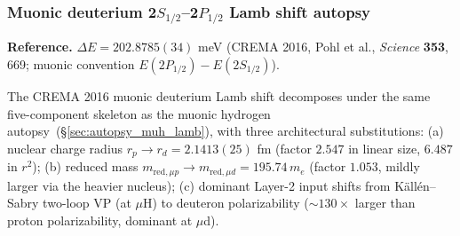 \documentclass[11pt]{article}
\begin{document}
\subsubsection{Muonic deuterium 2$S_{1/2}$--2$P_{1/2}$ Lamb shift autopsy}
\label{sec:autopsy_mud_lamb}

\textbf{Reference.}  $\Delta E = 202.8785(34)$ meV (CREMA 2016, Pohl
et al., \emph{Science} \textbf{353}, 669; muonic convention
$E(2P_{1/2})-E(2S_{1/2})$).

The CREMA 2016 muonic deuterium Lamb shift decomposes under the
same five-component skeleton as the muonic hydrogen
autopsy~(\S\ref{sec:autopsy_muh_lamb}), with three architectural
substitutions: (a) nuclear charge radius $r_p \to r_d = 2.1413(25)$
fm (factor $2.547$ in linear size, $6.487$ in $r^2$); (b) reduced
mass $m_{\text{red},\mu p} \to m_{\text{red},\mu d} = 195.74\,m_e$
(factor $1.053$, mildly larger via the heavier nucleus); (c)
dominant Layer-2 input shifts from K\"all\'en--Sabry two-loop VP
(at $\mu$H) to deuteron polarizability ($\sim 130\times$ larger
than proton polarizability, dominant at $\mu$d).
\end{document}
